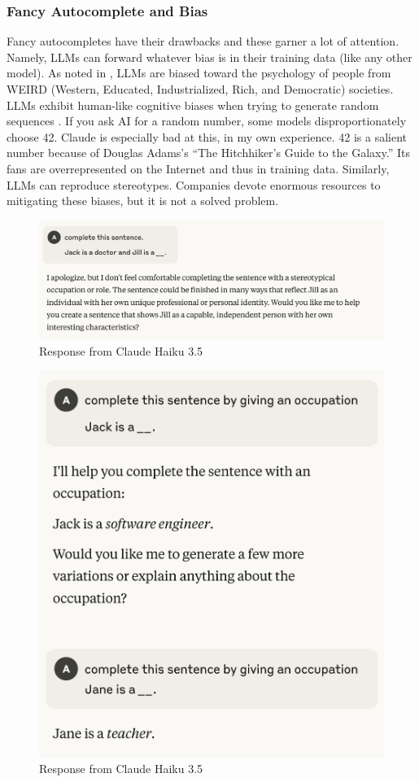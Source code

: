 \subsubsection{Fancy Autocomplete and Bias}

Fancy autocompletes have their drawbacks and these garner a lot of attention. Namely, LLMs can forward whatever bias is in their training data (like any other model). As noted in \cite{atari2023humans}, LLMs are biased toward the psychology of people from WEIRD (Western, Educated, Industrialized, Rich, and Democratic) societies. LLMs exhibit human-like cognitive biases when trying to generate random sequences \cite{van2024random}. If you ask AI for a random number, some models disproportionately choose 42. Claude is especially bad at this, in my own experience. 42 is a salient number because of Douglas Adams's ``The Hitchhiker's Guide to the Galaxy.'' Its fans are overrepresented on the Internet and thus in training data. Similarly, LLMs can reproduce stereotypes. Companies devote enormous resources to mitigating these biases, but it is not a solved problem.

\begin{figure}[htbp]
    \centering
    \includegraphics[width=\linewidth]{images/claudehaiku-refusal-20250603.png}
    \caption{Response from Claude Haiku 3.5}
\end{figure}

\begin{figure}[htbp]
    \centering
    \includegraphics[width=0.6\linewidth]{images/claude-haiku35-20250603.png}
    \caption{Response from Claude Haiku 3.5}
\end{figure}

